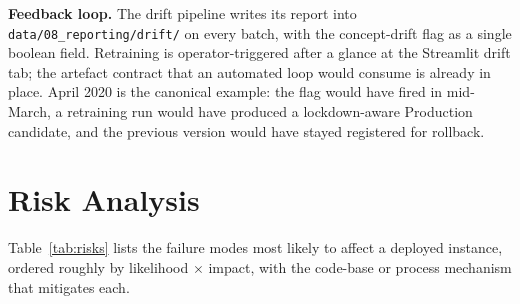 \documentclass[11pt,a4paper]{article}
\newcommand{\code}[1]{\texttt{\small #1}}
\begin{document}
\textbf{Feedback loop.} The drift pipeline writes its report into \code{data/08\_reporting/drift/} on every batch, with the concept-drift flag as a single boolean field. Retraining is operator-triggered after a glance at the Streamlit drift tab; the artefact contract that an automated loop would consume is already in place. April 2020 is the canonical example: the flag would have fired in mid-March, a retraining run would have produced a lockdown-aware Production candidate, and the previous version would have stayed registered for rollback.

\section{Risk Analysis}

Table~\ref{tab:risks} lists the failure modes most likely to affect a deployed instance, ordered roughly by likelihood $\times$ impact, with the code-base or process mechanism that mitigates each.
\end{document}
